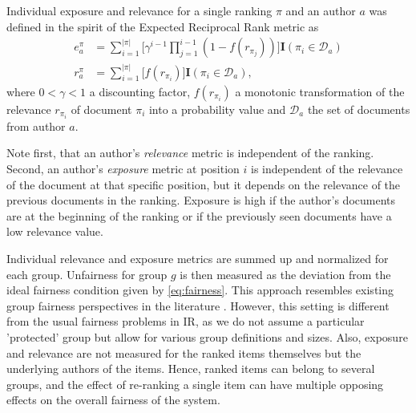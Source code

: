 \documentclass[sigconf, nonacm]{acmart}
\begin{document}
Individual exposure and relevance for a single ranking $\pi$ and an author $a$ was defined in the spirit of the Expected Reciprocal Rank metric \cite{chapelle_expected_2009} as
\begin{equation}
    \begin{split}
        e_a^\pi &= \sum_{i=1}^{|\pi|} \Big[\gamma^{i-1} \prod_{j=1}^{i-1}(1-f(r_{\pi_j}))\Big]\mathbf{I}(\pi_i \in \mathcal{D}_a) \\
        r_a^\pi &= \sum_{i=1}^{|\pi|}\Big[f(r_{\pi_i})\Big]\mathbf{I}(\pi_i \in \mathcal{D}_a), 
    \end{split}
\end{equation}
where $0 < \gamma < 1$ a discounting factor, $f(r_{\pi_i})$ a monotonic transformation of the relevance $r_{\pi_i}$ of document $\pi_i$ into a probability value and $\mathcal{D}_a$ the set of documents from author $a$.

Note first, that an author's \emph{relevance} metric is independent of the ranking. Second, an author's \emph{exposure} metric at position $i$ is independent of the relevance of the document at that specific position, but it depends on the relevance of the previous documents in the ranking. Exposure is high if the author's documents are at the beginning of the ranking or if the previously seen documents have a low relevance value. 

Individual relevance and exposure metrics are summed up and normalized for each group. Unfairness for group $g$ is then measured as the deviation from the ideal fairness condition given by \eqref{eq:fairness}. This approach resembles existing group fairness perspectives in the literature \cite{singh_fairness_2018, zehlike_reducing_2018, biega_equity_2018}. However, this setting is different from the usual fairness problems in IR, as we do not assume a particular 'protected' group but allow for various group definitions and sizes. Also, exposure and relevance are not measured for the ranked items themselves but the underlying authors of the items. Hence, ranked items can belong to several groups, and the effect of re-ranking a single item can have multiple opposing effects on the overall fairness of the system. 
\end{document}

